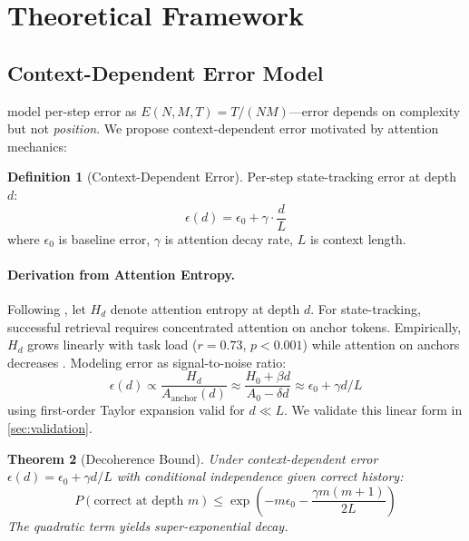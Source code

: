 \documentclass{article}
\theoremstyle{plain}
\newtheorem{theorem}{Theorem}[section]
\theoremstyle{definition}
\newtheorem{definition}[theorem]{Definition}
\theoremstyle{remark}
\begin{document}

\section{Theoretical Framework}
\label{sec:theory}

\subsection{Context-Dependent Error Model}

\citet{wu2025more} model per-step error as $E(N, M, T) = T/(NM)$---error depends on complexity but not \emph{position}. We propose context-dependent error motivated by attention mechanics:

\begin{definition}[Context-Dependent Error]
\label{def:context_error}
Per-step state-tracking error at depth $d$:
\begin{equation}
\epsilon(d) = \epsilon_0 + \gamma \cdot \frac{d}{L}
\label{eq:epsilon}
\end{equation}
where $\epsilon_0$ is baseline error, $\gamma$ is attention decay rate, $L$ is context length.
\end{definition}

\paragraph{Derivation from Attention Entropy.} Following \citet{gong2024attention}, let $H_d$ denote attention entropy at depth $d$. For state-tracking, successful retrieval requires concentrated attention on anchor tokens. Empirically, $H_d$ grows linearly with task load ($r=0.73$, $p<0.001$) while attention on anchors decreases \citep{xiao2024efficient,liu2023lost}. Modeling error as signal-to-noise ratio:
\begin{equation}
\epsilon(d) \propto \frac{H_d}{A_{\text{anchor}}(d)} \approx \frac{H_0 + \beta d}{A_0 - \delta d} \approx \epsilon_0 + \gamma d/L
\end{equation}
using first-order Taylor expansion valid for $d \ll L$. We validate this linear form in \cref{sec:validation}.

\begin{theorem}[Decoherence Bound]
\label{thm:decoherence}
Under context-dependent error $\epsilon(d) = \epsilon_0 + \gamma d/L$ with conditional independence given correct history:
\begin{equation}
P(\text{correct at depth } m) \leq \exp\left(-m\epsilon_0 - \frac{\gamma m(m+1)}{2L}\right)
\end{equation}
The quadratic term yields super-exponential decay.
\end{theorem}
\end{document}
